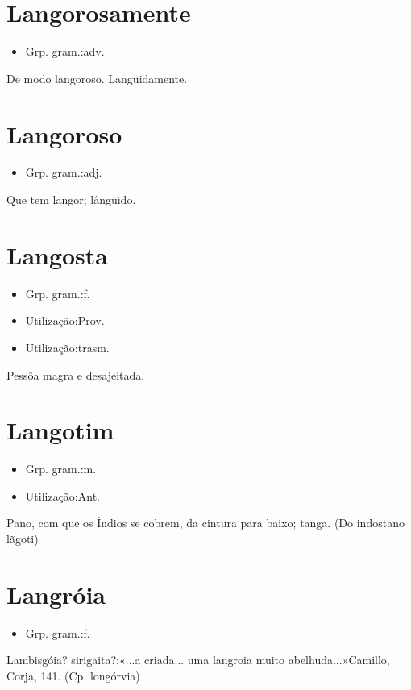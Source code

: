 \section{Langorosamente}
\begin{itemize}
\item {Grp. gram.:adv.}
\end{itemize}
De modo langoroso.
Languidamente.
\section{Langoroso}
\begin{itemize}
\item {Grp. gram.:adj.}
\end{itemize}
Que tem langor; lânguido.
\section{Langosta}
\begin{itemize}
\item {Grp. gram.:f.}
\end{itemize}
\begin{itemize}
\item {Utilização:Prov.}
\end{itemize}
\begin{itemize}
\item {Utilização:trasm.}
\end{itemize}
Pessôa magra e desajeitada.
\section{Langotim}
\begin{itemize}
\item {Grp. gram.:m.}
\end{itemize}
\begin{itemize}
\item {Utilização:Ant.}
\end{itemize}
Pano, com que os Índios se cobrem, da cintura para baixo; tanga.
(Do indostano \textunderscore lãgoti\textunderscore )
\section{Langróia}
\begin{itemize}
\item {Grp. gram.:f.}
\end{itemize}
Lambisgóia? sirigaita?:«\textunderscore ...a criada... uma langroia muito abelhuda...\textunderscore »Camillo, \textunderscore Corja\textunderscore , 141.
(Cp. \textunderscore longórvia\textunderscore )
